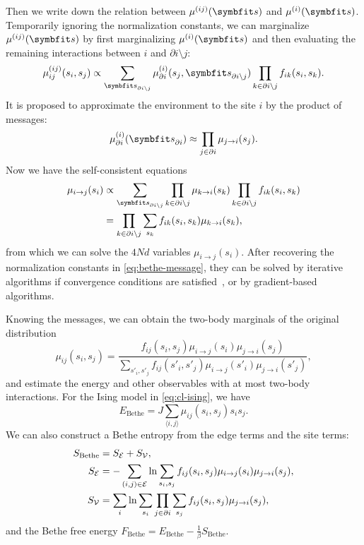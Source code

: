 Then we write down the relation between $\mu^{(i j)}(\vs)$ and $\mu^{(i)}(\vs)$. Temporarily ignoring the normalization constants, we can marginalize $\mu^{(i j)}(\vs)$ by first marginalizing $\mu^{(i)}(\vs)$ and then evaluating the remaining interactions between $i$ and $\partial i \setminus j$:
\begin{equation}
\mu^{(i j)}_{i j}(s_i, s_j) \propto \sum_{\vs_{\partial i \setminus j}} \mu^{(i)}_{\partial i}(s_j, \vs_{\partial i \setminus j}) \prod_{k \in \partial i \setminus j} f_{i k}(s_i, s_k).
\end{equation}
It is proposed to approximate the environment to the site $i$ by the product of messages:
\begin{equation}
\mu^{(i)}_{\partial i}(\vs_{\partial i}) \approx \prod_{j \in \partial i} \mu_{j \to i}(s_j).
\label{eq:bethe-prob}
\end{equation}
Now we have the self-consistent equations
\begin{align}
\mu_{i \to j}(s_i) &\propto \sum_{\vs_{\partial i \setminus j}} \prod_{k \in \partial i \setminus j} \mu_{k \to i}(s_k) \prod_{k \in \partial i \setminus j} f_{i k}(s_i, s_k) \\
&= \prod_{k \in \partial i \setminus j} \sum_{s_k} f_{i k}(s_i, s_k) \mu_{k \to i}(s_k),
\label{eq:bethe-message}
\end{align}
from which we can solve the $4 N d$ variables $\mu_{i \to j}(s_i)$. After recovering the normalization constants in \cref{eq:bethe-message}, they can be solved by iterative algorithms if convergence conditions are satisfied~\cite{mooij2007sufficient}, or by gradient-based algorithms.

Knowing the messages, we can obtain the two-body marginals of the original distribution
\begin{equation}
\mu_{i j}(s_i, s_j) = \frac{f_{i j}(s_i, s_j) \mu_{i \to j}(s_i) \mu_{j \to i}(s_j)}{\sum_{s'_i, s'_j} f_{i j}(s'_i, s'_j) \mu_{i \to j}(s'_i) \mu_{j \to i}(s'_j)},
\end{equation}
and estimate the energy and other observables with at most two-body interactions. For the Ising model in \cref{eq:cl-ising}, we have
\begin{equation}
E_\text{Bethe} = J \sum_{\langle i, j \rangle} \mu_{i j}(s_i, s_j) s_i s_j.
\end{equation}
We can also construct a Bethe entropy from the edge terms and the site terms:
\begin{align}
S_\text{Bethe} &= S_{\mathcal{E}} + S_{\mathcal{V}}, \\
S_{\mathcal{E}} &= -\sum_{(i, j) \in \mathcal{E}} \ln \sum_{s_i, s_j} f_{i j}(s_i, s_j) \mu_{i \to j}(s_i) \mu_{j \to i}(s_j), \\
S_{\mathcal{V}} &= \sum_i \ln \sum_{s_i} \prod_{j \in \partial i} \sum_{s_j} f_{i j}(s_i, s_j) \mu_{j \to i}(s_j),
\end{align}
and the Bethe free energy $F_\text{Bethe} = E_\text{Bethe} - \frac{1}{\beta} S_\text{Bethe}$.

